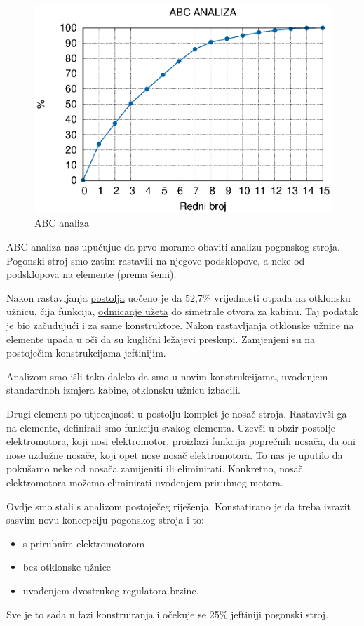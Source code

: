 \documentclass[a4paper,12pt]{article}
\numberwithin{figure}{section}
\begin{document}
\begin{figure}
  \centering
    \includegraphics[width=0.8\paperwidth]{abcAnaliza.eps}
    \caption{ABC analiza}
    \label{analiza}
\end{figure}
\FloatBarrier

ABC analiza nas upučujue da prvo moramo obaviti analizu pogonskog stroja. Pogonski stroj smo zatim rastavili na njegove podsklopove, a neke od podsklopova na elemente (prema šemi).\par
Nakon rastavljanja \underline{postolja} uočeno je da 52,7\% vrijednosti otpada na otklonsku užnicu, čija funkcija, \underline{odmicanje užeta} do simetrale otvora za kabinu. Taj podatak je bio začuđujući i za same konstruktore. Nakon rastavljanja otklonske užnice na elemente upada u oči da su kuglični ležajevi preskupi. Zamjenjeni su na postoječim konstrukcijama jeftinijim.\par
Analizom smo išli tako daleko da smo u novim konstrukcijama, uvođenjem standardnoh izmjera kabine, otklonsku užnicu izbacili.\par
Drugi element po utjecajnosti u postolju komplet je nosač stroja. Rastavivši ga na elemente, definirali smo funkciju svakog elementa. Uzevši u obzir postolje elektromotora, koji nosi elektromotor, proizlazi funkcija poprečnih nosača, da oni nose uzdužne nosače, koji opet nose nosač elektromotora. To nas je uputilo da pokušamo neke od nosača zamijeniti ili eliminirati. Konkretno, nosač elektromotora možemo eliminirati uvođenjem prirubnog motora.\par
Ovdje smo stali s analizom postoječeg riješenja. Konstatirano je da treba izrazit sasvim novu koncepciju pogonskog stroja i to:
\begin{itemize}
\item s prirubnim elektromotorom
\item bez otklonske užnice
\item uvođenjem dvostrukog regulatora brzine.
\end{itemize}
Sve je to sada u fazi konstruiranja i očekuje se 25\% jeftiniji pogonski stroj.
\end{document}
